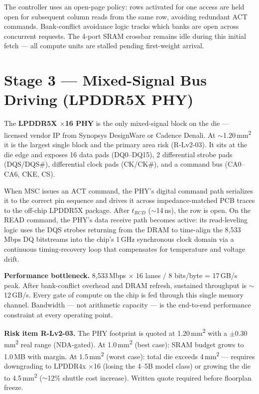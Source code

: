 \documentclass[11pt,letterpaper]{article}
\begin{document}
The controller uses an open-page policy: rows activated for one access are held open for
subsequent column reads from the same row, avoiding redundant ACT commands. Bank-conflict
avoidance logic tracks which banks are open across concurrent requests. The 4-port SRAM
crossbar remains idle during this initial fetch --- all compute units are stalled pending
first-weight arrival.

\section{Stage 3 --- Mixed-Signal Bus Driving (LPDDR5X PHY)}

The \textbf{LPDDR5X $\times$16 PHY} is the only mixed-signal block on the die --- licensed
vendor IP from Synopsys DesignWare or Cadence Denali. At $\sim$1.20\,mm\textsuperscript{2} it is the largest
single block and the primary area risk (R-Lv2-03). It sits at the die edge and exposes 16
data pads (DQ0--DQ15), 2 differential strobe pads (DQS/DQS\#), differential clock pads
(CK/CK\#), and a command bus (CA0--CA6, CKE, CS).

When MSC issues an ACT command, the PHY's digital command path serializes it to the correct
pin sequence and drives it across impedance-matched PCB traces to the off-chip LPDDR5X
package. After $t_{RCD}$ ($\sim$14\,ns), the row is open. On the READ command, the PHY's data
receive path becomes active: its read-leveling logic uses the DQS strobes returning from the
DRAM to time-align the 8{,}533\,Mbps DQ bitstreams into the chip's 1\,GHz synchronous clock
domain via a continuous timing-recovery loop that compensates for temperature and voltage
drift.

\textbf{Performance bottleneck.} 8{,}533\,Mbps $\times$ 16 lanes $/$ 8 bits/byte =
17\,GB/s peak. After bank-conflict overhead and DRAM refresh, sustained throughput is
$\sim$12\,GB/s. Every gate of compute on the chip is fed through this single memory channel.
Bandwidth --- not arithmetic capacity --- is the end-to-end performance constraint at every
operating point.

\textbf{Risk item R-Lv2-03.} The PHY footprint is quoted at 1.20\,mm\textsuperscript{2} with a
$\pm$0.30\,mm\textsuperscript{2} real range (NDA-gated). At 1.0\,mm\textsuperscript{2} (best case): SRAM budget grows to
1.0\,MB with margin. At 1.5\,mm\textsuperscript{2} (worst case): total die exceeds 4\,mm\textsuperscript{2} --- requires
downgrading to LPDDR4x $\times$16 (losing the 4--5B model class) or growing the die to
4.5\,mm\textsuperscript{2} ($\sim$12\% shuttle cost increase). Written quote required before floorplan freeze.
\end{document}
